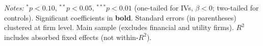 \begin{landscape}
\begin{table}[H]
\begin{tabular}{lcccccccccccc}
\bottomrule
\end{tabular}
\begin{minipage}{\linewidth}
\vspace{2pt}\scriptsize
\textit{Notes:} $^{*}p<0.10$, $^{**}p<0.05$, $^{***}p<0.01$ (one-tailed for IVs, $\beta < 0$; two-tailed for controls).
 Significant coefficients in \textbf{bold}.
 Standard errors (in parentheses) clustered at firm level.
 Main sample (excludes financial and utility firms).
 $R^2$ includes absorbed fixed effects (not within-$R^2$).
\end{minipage}
\end{table}
\end{landscape}